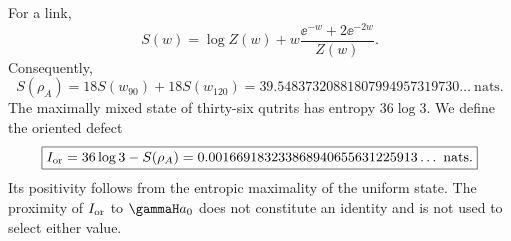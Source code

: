 For a link,
\begin{equation}
\label{rm:eq:modular-link-entropy}
S(w)=\log Z(w)
+w\frac{\ee^{-w}+2\ee^{-2w}}{Z(w)}.
\end{equation}
Consequently,
\begin{equation}
\label{rm:eq:modular-entropy-value}
S(\rho_A)=18S(w_{90})+18S(w_{120})
=39.54837320881807994957319730\ldots\ \text{nats}.
\end{equation}
The maximally mixed state of thirty-six qutrits has entropy
\(36\log3\). We define the oriented defect
\begin{equation}
\label{rm:eq:modular-oriented-information}
\boxed{
I_{\rm or}=36\log3-S(\rho_A)
=0.001669183233868940655631225913\ldots\ \text{nats}.}
\end{equation}
Its positivity follows from the entropic maximality of the
uniform state. The proximity of \(I_{\rm or}\) to \(\gammaH a_0\) does not constitute
an identity and is not used to select either value.
